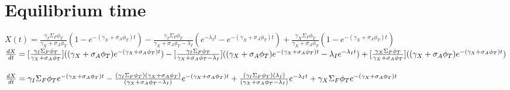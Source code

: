 \documentclass[11pt,a4paper]{article}
\begin{document}
\newpage

\section{Equilibrium time}
$X(t)=\frac{\gamma_I\Sigma_F\phi_T}{\gamma_X+\sigma_A\phi_T}(1-e^{-(\gamma_X+\sigma_A\phi_T)t})-\frac{\gamma_I\Sigma_F\phi_T}{\gamma_X+\sigma_A\phi_T-\lambda_I}(e^{-\lambda_I t}-e^{-(\gamma_X+\sigma_A\phi_T)t})+\frac{\gamma_X\Sigma_F\phi_T}{\gamma_X+\sigma_A\phi_T}(1-e^{-(\gamma_X+\sigma_A\phi_T)t})$ \\

\noindent $\frac{dX}{dt}=[\frac{\gamma_I\Sigma_F\phi_T}{\gamma_X+\sigma_A\phi_T}]((\gamma_X+\sigma_A\phi_T)e^{-(\gamma_X+\sigma_A\phi_T)t})-[\frac{\gamma_I\Sigma_F\phi_T}{\gamma_X+\sigma_A\phi_T-\lambda_I}]((\gamma_X+\sigma_A\phi_T)e^{-(\gamma_X+\sigma_A\phi_T)t}-\lambda_Ie^{-\lambda_I t}) \\ +[\frac{\gamma_X\Sigma_F\phi_T}{\gamma_X+\sigma_A\phi_T}]((\gamma_X+\sigma_A\phi_T)e^{-(\gamma_X+\sigma_A\phi_T)t})$ \\ \\

\noindent $\frac{dX}{dt}=\gamma_I\Sigma_F\phi_T e^{-(\gamma_X+\sigma_A\phi_T)t} \\
-\frac{(\gamma_I\Sigma_F\phi_T)(\gamma_X+\sigma_A\phi_T)}{(\gamma_X+\sigma_A\phi_T-\lambda_I)}e^{-(\gamma_X+\sigma_A\phi_T)t} \\
+\frac{(\gamma_I\Sigma_F\phi_T)(\lambda_I)}{(\gamma_X+\sigma_A\phi_T-\lambda_I)}e^{-\lambda_I t} \\
+\gamma_X\Sigma_F\phi_T e^{-(\gamma_X+\sigma_A\phi_T)t}$ \\ \\
\end{document}
